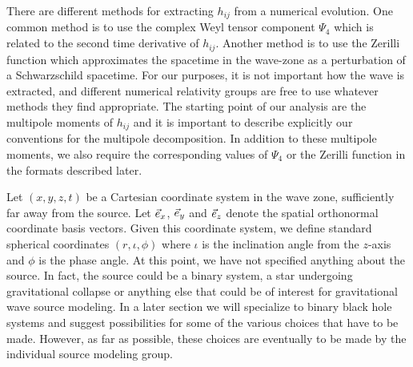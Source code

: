 \documentclass[10pt]{ligodcc}
\begin{document}
There are different methods for extracting $h_{ij}$ from a numerical
evolution.  One common method is to use the complex Weyl tensor
component $\Psi_4$ which is related to the second time derivative of
$h_{ij}$. Another method is to use the Zerilli function which
approximates the spacetime in the wave-zone as a perturbation of a
Schwarzschild spacetime.  For our purposes, it is not important how
the wave is extracted, and different numerical relativity groups are
free to use whatever methods they find appropriate.  The starting
point of our analysis are the multipole moments of $h_{ij}$ and it is
important to describe explicitly our conventions for the multipole
decomposition.  In addition to these multipole moments, we also
require the corresponding values of $\Psi_4$ or the Zerilli function
in the formats described later.

Let $(x,y,z,t)$ be a Cartesian coordinate system in the wave zone,
sufficiently far away from the source. Let $\vec{e}_x$, $\vec{e}_y$ and
$\vec{e}_z$ denote the spatial orthonormal coordinate basis vectors.
Given this coordinate system, we define standard spherical coordinates
$(r,\iota,\phi)$ where $\iota$ is the inclination angle from the
$z$-axis and $\phi$ is the phase angle.  At this point, we have not
specified anything about the source.  In fact, the source could be a
binary system, a star undergoing gravitational collapse or anything
else that could be of interest for gravitational wave source modeling.
In a later section we will specialize to binary black hole systems and
suggest possibilities for some of the various choices that have to be
made.  However, as far as possible, these choices are eventually to be
made by the individual source modeling group.
\end{document}
